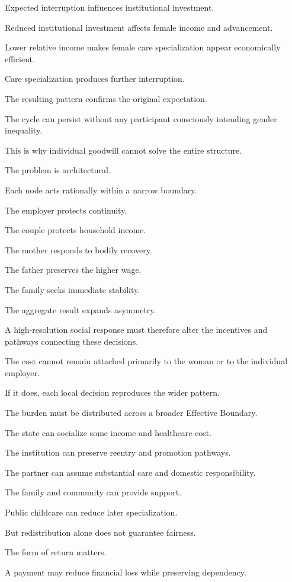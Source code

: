 Expected interruption influences institutional investment.

Reduced institutional investment affects female income and advancement.

Lower relative income makes female care specialization appear economically efficient.

Care specialization produces further interruption.

The resulting pattern confirms the original expectation.

The cycle can persist without any participant consciously intending gender inequality.

This is why individual goodwill cannot solve the entire structure.

The problem is architectural.

Each node acts rationally within a narrow boundary.

The employer protects continuity.

The couple protects household income.

The mother responds to bodily recovery.

The father preserves the higher wage.

The family seeks immediate stability.

The aggregate result expands asymmetry.

A high-resolution social response must therefore alter the incentives and pathways connecting these decisions.

The cost cannot remain attached primarily to the woman or to the individual employer.

If it does, each local decision reproduces the wider pattern.

The burden must be distributed across a broader Effective Boundary.

The state can socialize some income and healthcare cost.

The institution can preserve reentry and promotion pathways.

The partner can assume substantial care and domestic responsibility.

The family and community can provide support.

Public childcare can reduce later specialization.

But redistribution alone does not guarantee fairness.

The form of return matters.

A payment may reduce financial loss while preserving dependency.

